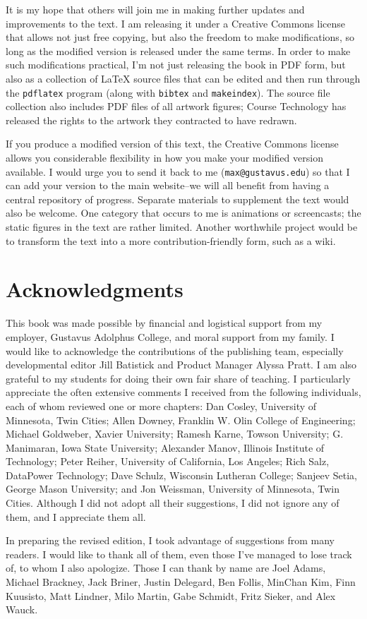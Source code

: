 It is my hope that others will join me in making further updates and improvements to the text.  I am releasing it under a Creative Commons license that allows not just free copying, but also the freedom to make modifications, so long as the modified version is released under the same terms.  In order to make such modifications practical, I'm not just releasing the book in PDF form, but also as a collection of LaTeX source files that can be edited and then run through the \texttt{pdflatex} program (along with \texttt{bibtex} and \texttt{makeindex}).  The source file collection also includes PDF files of all artwork figures; Course Technology has released the rights to the artwork they contracted to have redrawn.

If you produce a modified version of this text, the Creative Commons license allows you considerable flexibility in how you make your modified version available.  I would urge you to send it back to me (\verb|max@gustavus.edu|) so that I can add your version to the main website--we will all benefit from having a central repository of progress.  Separate materials to supplement the text would also be welcome.  One category that occurs to me is animations or screencasts; the static figures in the text are rather limited. Another worthwhile project would be to transform the text into a more contribution-friendly form, such as a wiki.

\section*{Acknowledgments}

This book was made possible by financial and logistical support from
my employer, Gustavus Adolphus College, and moral support from my
family.  I would like to acknowledge the contributions of the
publishing team, especially developmental editor Jill Batistick and
Product Manager Alyssa Pratt.  I am also grateful to my students for
doing their own fair share of teaching.  I particularly appreciate the
often extensive comments I received from the following individuals,
each of whom reviewed one or more chapters: Dan Cosley, University of
Minnesota, Twin Cities; Allen Downey, Franklin W. Olin College of
Engineering; Michael Goldweber, Xavier University; Ramesh Karne,
Towson University; G. Manimaran, Iowa State University; Alexander
Manov, Illinois Institute of Technology; Peter Reiher, University of
California, Los Angeles; Rich Salz, DataPower Technology; Dave Schulz,
Wisconsin Lutheran College; Sanjeev Setia, George Mason University;
and Jon Weissman, University of Minnesota, Twin Cities.  Although I
did not adopt all their suggestions, I did not ignore any of them, and
I appreciate them all.

In preparing the revised edition, I took advantage of suggestions from many readers.  I would like to thank all of them, even those I've managed to lose track of, to whom I also apologize.  Those I can thank by name are Joel Adams, Michael Brackney, Jack Briner, Justin Delegard, Ben Follis, MinChan Kim, Finn Kuusisto, Matt Lindner, Milo Martin, Gabe Schmidt, Fritz Sieker, and Alex Wauck.
